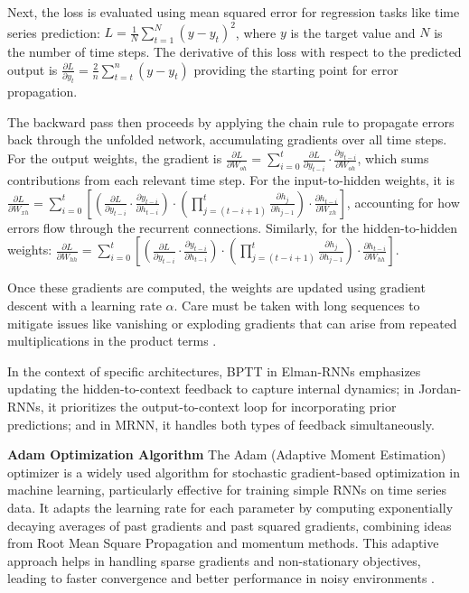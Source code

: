 \documentclass[conference, 10pt]{IEEEtran}
\begin{document}
Next, the loss is evaluated using mean squared error for regression tasks like time series prediction: \( L =
\frac{1}{N} \sum_{t=1}^{N} (y - y_t)^2 \), where $y$ is the target value and $N$ is the number of time steps. The derivative
of this loss with respect to the predicted output is \( \frac{\partial{L}}{\partial{y_t}} = \frac{2}{n}\sum_{t=t}^{n}(y
- y_t) \) providing the starting point for error propagation.

The backward pass then proceeds by applying the chain rule to propagate errors back through the unfolded network,
accumulating gradients over all time steps. For the output weights, the gradient is \( \frac{\partial L}{\partial
W_{oh}} = \sum_{i=0}^{t} \frac{\partial L}{\partial y_{t-i}} \cdot \frac{\partial y_{t-i}}{\partial W_{oh}} \), which
sums contributions from each relevant time step. For the input-to-hidden weights, it is \( \frac{\partial L}{\partial
W_{xh}} = \sum_{i=0}^{t} \left[ \left( \frac{\partial L}{\partial y_{t-i}} \cdot \frac{\partial y_{t-i}}{\partial
h_{t-i}} \right) \cdot \left( \prod_{j=(t-i+1)}^{t} \frac{\partial h_j}{\partial h_{j-1}} \right) \cdot \frac{\partial
h_{t-i}}{\partial W_{xh}} \right] \), accounting for how errors flow through the recurrent connections. Similarly, for
the hidden-to-hidden weights: \( \frac{\partial L}{\partial W_{hh}} = \sum_{i=0}^{t} \left[ \left( \frac{\partial
L}{\partial y_{t-i}} \cdot \frac{\partial y_{t-i}}{\partial h_{t-i}} \right) \cdot \left( \prod_{j=(t-i+1)}^{t}
\frac{\partial h_j}{\partial h_{j-1}} \right) \cdot \frac{\partial h_{t-i}}{\partial W_{hh}} \right] \). 

Once these gradients are computed, the weights are updated using gradient descent with a learning rate \( \alpha \).
Care must be taken with long sequences to mitigate issues like vanishing or exploding gradients that can arise from
repeated multiplications in the product terms \cite{quarkmlBackpropagationThrough}.

In the context of specific architectures, BPTT in Elman-RNNs emphasizes updating the hidden-to-context feedback to
capture internal dynamics; in Jordan-RNNs, it prioritizes the output-to-context loop for incorporating prior
predictions; and in MRNN, it handles both types of feedback simultaneously.

\textbf{Adam Optimization Algorithm}
The Adam (Adaptive Moment Estimation) optimizer is a widely used algorithm for stochastic gradient-based optimization in
machine learning, particularly effective for training simple RNNs on time series data. It adapts the learning rate for
each parameter by computing exponentially decaying averages of past gradients and past squared gradients, combining
ideas from Root Mean Square Propagation and momentum methods. This adaptive approach helps in handling sparse gradients
and non-stationary objectives, leading to faster convergence and better performance in noisy environments
\cite{kingma2017adammethodstochasticoptimization} \cite{machinelearningmasteryGentleIntroduction}.
\end{document}

